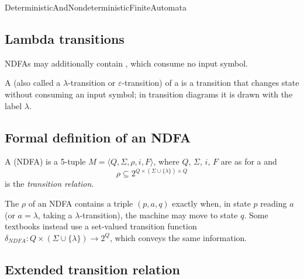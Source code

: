\documentclass[hidelinks]{article}
\begin{document}
\begin{smodule}[title={Deterministic and Nondeterministic Finite State Automata}]{DeterministicAndNondeterministicFiniteAutomata}
\subsection{Lambda transitions}

NDFAs may additionally contain , which consume no input symbol.

\begin{sdefinition}[for=lambda-transition]
A  (also called a $\lambda$-transition or $\varepsilon$-transition) of a  is a transition that changes state without consuming an input symbol; in transition diagrams it is drawn with the label $\lambda$.
\end{sdefinition}

\subsection{Formal definition of an NDFA}

\begin{sdefinition}[for=nondeterministic finite-state automaton]
A  (NDFA) is a 5-tuple $M = \langle Q, \Sigma, \rho, i, F \rangle$, where $Q$, $\Sigma$, $i$, $F$ are as for a  and
\[
\rho \subseteq 2^{Q \times (\Sigma \cup \{\lambda\}) \times Q}
\]
is the \emph{transition relation}.
\end{sdefinition}

\begin{sdefinition}[for=transition relation]
The  $\rho$ of an NDFA contains a triple $(p, a, q)$ exactly when, in state $p$ reading $a$ (or $a = \lambda$, taking a $\lambda$-transition), the machine may move to state $q$. Some textbooks instead use a set-valued transition function $\delta_{NDFA} : Q \times (\Sigma \cup \{\lambda\}) \to 2^Q$, which conveys the same information.
\end{sdefinition}

\subsection{Extended transition relation}


\end{smodule}
\end{document}
